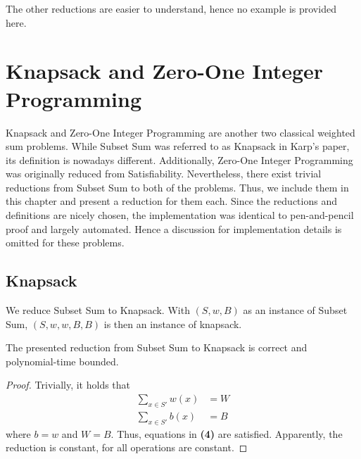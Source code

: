 The other reductions are easier to understand, hence no example is provided here.

\section{Knapsack and Zero-One Integer Programming}
Knapsack and Zero-One Integer Programming are another two classical weighted sum problems. While Subset Sum was referred 
to as Knapsack in Karp's paper, its definition is nowadays different. Additionally, Zero-One Integer Programming 
was originally reduced from Satisfiability. Nevertheless, there exist trivial reductions from Subset Sum to both of the problems. Thus, 
we include them in this chapter and present a reduction for them each. 
Since the reductions and definitions are nicely chosen, the implementation was identical to pen-and-pencil proof 
and largely automated. Hence a discussion for implementation details is omitted for these problems.

\subsection{Knapsack}
We reduce Subset Sum to Knapsack. With $(S, w, B)$ as an instance of Subset Sum, $(S, w, w, B, B)$
is then an instance of knapsack.
\begin{theorem}
    The presented reduction from Subset Sum to Knapsack is correct and polynomial-time bounded.
\end{theorem}
\begin{proof}
    Trivially, it holds that 
    \begin{align*}
        \sum_{x \in S'} w(x) &= W \\ 
        \sum_{x \in S'} b(x) &= B
    \end{align*}
    where $b = w$ and $W = B$. Thus, equations in \textbf{(4)} are satisfied.
    Apparently, the reduction is constant, for all operations are constant. 
\end{proof}

